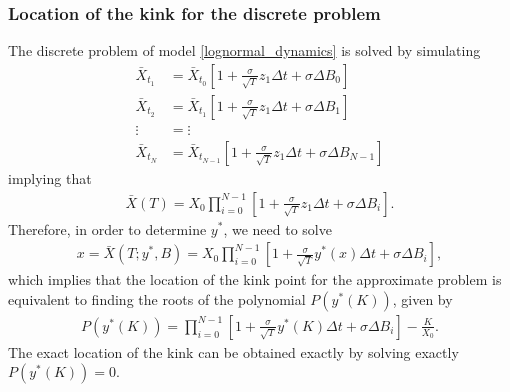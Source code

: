 \subsubsection*{Location of the kink for the discrete problem}
The discrete problem of model \eqref{lognormal_dynamics} is solved by simulating 
\begin{align}
	\bar{X}_{t_1}&= \bar{X}_{t_0} \left[ 1+\frac{\sigma}{\sqrt{T}} z_1 \Delta t+ \sigma \Delta B_0\right]\nonumber\\
	\bar{X}_{t_2}&= \bar{X}_{t_1} \left[ 1+\frac{\sigma}{\sqrt{T}} z_1 \Delta t+ \sigma \Delta B_1\right]\nonumber\\
	\vdots &= \vdots\nonumber\\
	\bar{X}_{t_N}&= \bar{X}_{t_{N-1}} \left[ 1+\frac{\sigma}{\sqrt{T}} z_1 \Delta t+ \sigma \Delta B_{N-1}\right]
\end{align}
implying that
\begin{align}
\bar{X}(T)=X_0 \prod_{i=0}^{N-1} \left[ 1+\frac{\sigma}{\sqrt{T}} z_1 \Delta t+ \sigma \Delta B_{i}\right].
\end{align}
Therefore, in order to determine $y^{\ast}$, we need to solve
\begin{align}
	x=\bar{X}(T;y^{\ast},B)=X_0 \prod_{i=0}^{N-1} \left[ 1+\frac{\sigma}{\sqrt{T}} y^{\ast}(x) \Delta t+ \sigma \Delta B_{i}\right],
\end{align}
which implies that the location of the kink point for the approximate problem is equivalent to finding the roots of the polynomial $P(y^\ast(K))$, given by
\begin{align}\label{polynomial_kink_location}
	P(y^{\ast}(K))=\prod_{i=0}^{N-1} \left[ 1+\frac{\sigma}{\sqrt{T}} y^\ast(K) \Delta t+ \sigma \Delta B_{i}\right]-\frac{K}{X_0}.
\end{align}
The exact location of the kink can be obtained exactly by solving exactly $P(y^{\ast}(K))=0$. 

